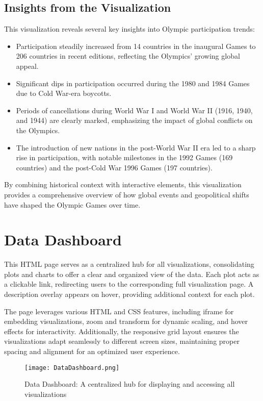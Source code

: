 \subsection{Insights from the Visualization}

This visualization reveals several key insights into Olympic participation trends:
\begin{itemize}
    \item Participation steadily increased from 14 countries in the inaugural Games to 206 countries in recent editions, reflecting the Olympics' growing global appeal.
    \item Significant dips in participation occurred during the 1980 and 1984 Games due to Cold War-era boycotts.
    \item Periods of cancellations during World War I and World War II (1916, 1940, and 1944) are clearly marked, emphasizing the impact of global conflicts on the Olympics.
    \item The introduction of new nations in the post-World War II era led to a sharp rise in participation, with notable milestones in the 1992 Games (169 countries) and the post-Cold War 1996 Games (197 countries).
\end{itemize}

By combining historical context with interactive elements, this visualization provides a comprehensive overview of how global events and geopolitical shifts have shaped the Olympic Games over time.

\section{Data Dashboard}

This HTML page serves as a centralized hub for all visualizations, consolidating plots and charts to offer a clear and organized view of the data. Each plot acts as a clickable link, redirecting users to the corresponding full visualization page. A description overlay appears on hover, providing additional context for each plot.

The page leverages various HTML and CSS features, including iframe for embedding visualizations, zoom and transform for dynamic scaling, and hover effects for interactivity. Additionally, the responsive grid layout ensures the visualizations adapt seamlessly to different screen sizes, maintaining proper spacing and alignment for an optimized user experience.

\begin{figure}[ht]
    \centering
    \texttt{[image: DataDashboard.png]}
    \caption{Data Dashboard: A centralized hub for displaying and accessing all visualizations}
    \label{fig:dashboard}
\end{figure}
